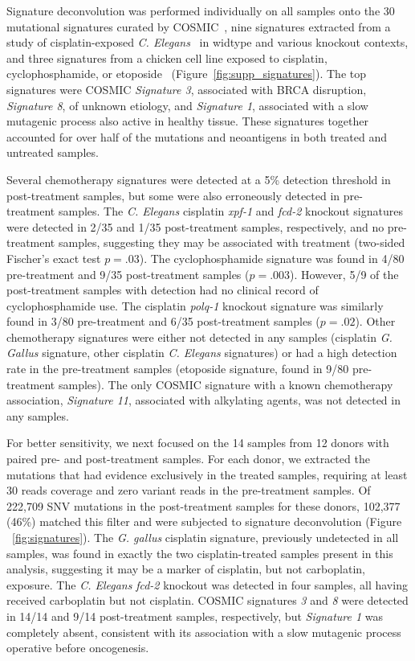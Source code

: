 Signature deconvolution was performed individually on all samples onto the 30 mutational signatures curated by COSMIC~\cite{364242}, nine signatures extracted from a study of cisplatin-exposed \textit{C. Elegans}~\cite{Meier_2014} in widtype and various knockout contexts, and three signatures from a chicken cell line exposed to cisplatin, cyclophosphamide, or etoposide~\cite{Szikriszt_2016} (Figure~\ref{fig:supp_signatures}). The top signatures were COSMIC \textit{Signature 3}, associated with BRCA disruption, \textit{Signature 8}, of unknown etiology, and \textit{Signature 1}, associated with a slow mutagenic process also active in healthy tissue. These signatures together accounted for over half of the mutations and neoantigens in both treated and untreated samples.

Several chemotherapy signatures were detected at a 5\% detection threshold in post-treatment samples, but some were also erroneously detected in pre-treatment samples. The \textit{C. Elegans} cisplatin \textit{xpf-1} and \textit{fcd-2} knockout signatures were detected in 2/35 and 1/35 post-treatment samples, respectively, and no pre-treatment samples, suggesting they may be associated with treatment (two-sided Fischer's exact test $p=.03$). The cyclophosphamide signature was found in 4/80 pre-treatment and 9/35 post-treatment samples ($p=.003$). However, 5/9 of the post-treatment samples with detection had no clinical record of cyclophosphamide use. The cisplatin \textit{polq-1} knockout signature was similarly found in 3/80 pre-treatment and 6/35 post-treatment samples ($p=.02$). Other chemotherapy signatures were either not detected in any samples (cisplatin \textit{G. Gallus} signature, other cisplatin \textit{C. Elegans} signatures) or had a high detection rate in the pre-treatment samples (etoposide signature, found in 9/80 pre-treatment samples). The only COSMIC signature with a known chemotherapy association, \textit{Signature 11}, associated with alkylating agents, was not detected in any samples.

For better sensitivity, we next focused on the 14 samples from 12 donors with paired pre- and post-treatment samples. For each donor, we extracted the mutations that had evidence exclusively in the treated samples, requiring at least 30 reads coverage and zero variant reads in the pre-treatment samples. Of 222,709 SNV mutations in the post-treatment samples for these donors, 102,377 (46\%) matched this filter and were subjected to signature deconvolution (Figure ~\ref{fig:signatures}). The \textit{G. gallus} cisplatin signature, previously undetected in all samples, was found in exactly the two cisplatin-treated samples present in this analysis, suggesting it may be a marker of cisplatin, but not carboplatin, exposure. The \textit{C. Elegans} \textit{fcd-2} knockout was detected in four samples, all having received carboplatin but not cisplatin. COSMIC signatures \textit{3} and \textit{8} were detected in 14/14 and 9/14 post-treatment samples, respectively, but \textit{Signature 1} was completely absent, consistent with its association with a slow mutagenic process operative before oncogenesis.


